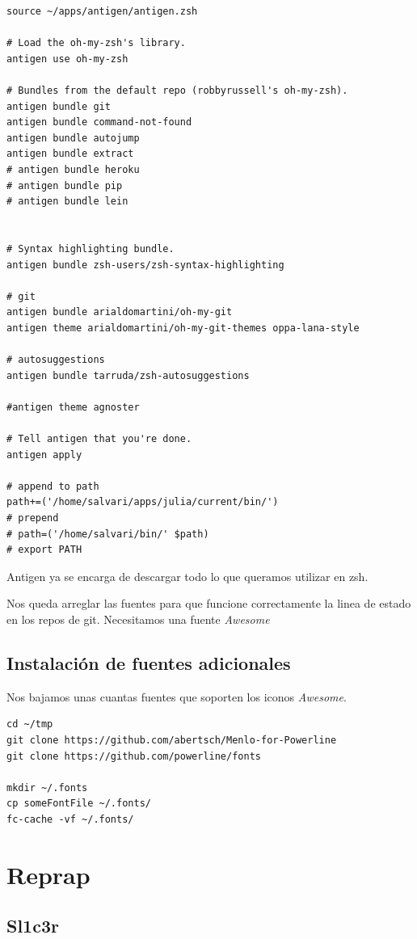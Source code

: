 \documentclass[12pt,spanish,]{article}
\begin{document}
\begin{verbatim}
source ~/apps/antigen/antigen.zsh

# Load the oh-my-zsh's library.
antigen use oh-my-zsh

# Bundles from the default repo (robbyrussell's oh-my-zsh).
antigen bundle git
antigen bundle command-not-found
antigen bundle autojump
antigen bundle extract
# antigen bundle heroku
# antigen bundle pip
# antigen bundle lein


# Syntax highlighting bundle.
antigen bundle zsh-users/zsh-syntax-highlighting

# git
antigen bundle arialdomartini/oh-my-git
antigen theme arialdomartini/oh-my-git-themes oppa-lana-style

# autosuggestions
antigen bundle tarruda/zsh-autosuggestions

#antigen theme agnoster

# Tell antigen that you're done.
antigen apply

# append to path
path+=('/home/salvari/apps/julia/current/bin/')
# prepend
# path=('/home/salvari/bin/' $path)
# export PATH
\end{verbatim}

Antigen ya se encarga de descargar todo lo que queramos utilizar en zsh.

Nos queda arreglar las fuentes para que funcione correctamente la linea
de estado en los repos de git. Necesitamos una fuente \emph{Awesome}

\subsection{Instalación de fuentes
adicionales}\label{instalaciuxf3n-de-fuentes-adicionales}

Nos bajamos unas cuantas fuentes que soporten los iconos \emph{Awesome}.

\begin{verbatim}
cd ~/tmp
git clone https://github.com/abertsch/Menlo-for-Powerline
git clone https://github.com/powerline/fonts

mkdir ~/.fonts
cp someFontFile ~/.fonts/
fc-cache -vf ~/.fonts/
\end{verbatim}

\section{Reprap}\label{reprap}

\subsection{Sl1c3r}\label{sl1c3r}
\end{document}
